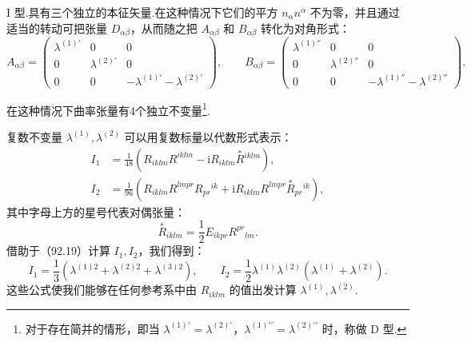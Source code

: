 I 型.具有三个独立的本征矢量.在这种情况下它们的平方 $n_{\alpha}n^{\alpha}$ 不为零，并且通过适当的转动可把张量 $D_{\alpha\beta}$，从而随之把 $A_{\alpha\beta}$ 和 $B_{\alpha\beta}$ 转化为对角形式：
\begin{equation}
  A_{\alpha\beta}=
  \begin{pmatrix}
    \lambda^{(1)'} & 0 & 0\\
    0 & \lambda^{(2)'} & 0\\
    0 & 0 & -\lambda^{(1)'}-\lambda^{(2)'}
  \end{pmatrix},\qquad
  B_{\alpha\beta}=
  \begin{pmatrix}
    \lambda^{(1)''} & 0 & 0\\
    0 & \lambda^{(2)''} & 0\\
    0 & 0 & -\lambda^{(1)''}-\lambda^{(2)''}
  \end{pmatrix}.
\end{equation}

在这种情况下曲率张量有4个独立不变量\footnote{对于存在简并的情形，即当 $\lambda^{(1)\prime}=\lambda^{(2)\prime}$，$\lambda^{(1)\prime\prime}=\lambda^{(2)\prime\prime}$ 时，称做 D 型.}.

复数不变量 $\lambda^{(1)},\lambda^{(2)}$ 可以用复数标量以代数形式表示：
\begin{equation}
\begin{aligned}
  I_1&=\frac{1}{48}\left(R_{iklm}R^{iklm}
  -\mathrm{i}R_{iklm}\stackrel{*}{R}{}^{iklm}\right),\\
  I_2&=\frac{1}{96}\left(R_{iklm}R^{lmpr}R_{pr}{}^{ik}
  +\mathrm{i}R_{iklm}R^{lmpr}\stackrel{*}{R}{}_{pr}{}^{ik}\right),
\end{aligned}
\end{equation}
其中字母上方的星号代表对偶张量：
\begin{equation*}
  \stackrel{*}{R}{}_{iklm}
  =\frac{1}{2}E_{ikpr}R^{pr}{}_{lm}.
\end{equation*}
借助于（92.19）计算 $I_1,I_2$，我们得到：
\begin{equation}
  I_1=\frac{1}{3}\left(\lambda^{(1)2}+\lambda^{(2)2}
  +\lambda^{(3)2}\right),\qquad
  I_2=\frac{1}{2}\lambda^{(1)}\lambda^{(2)}
  \left(\lambda^{(1)}+\lambda^{(2)}\right).
\end{equation}
这些公式使我们能够在任何参考系中由 $R_{iklm}$ 的值出发计算 $\lambda^{(1)},\lambda^{(2)}$.

